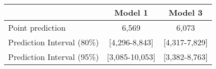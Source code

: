 \begin{tabular}{lcc}
      \toprule
      & Model 1 & Model 3 \\
      \midrule
Point prediction & 6,569 & 6,073 \\
Prediction Interval  (80\%) & [4,296-8,843] & [4,317-7,829] \\
Prediction Interval  (95\%) & [3,085-10,053] & [3,382-8,763] \\
\bottomrule
\end{tabular}%
